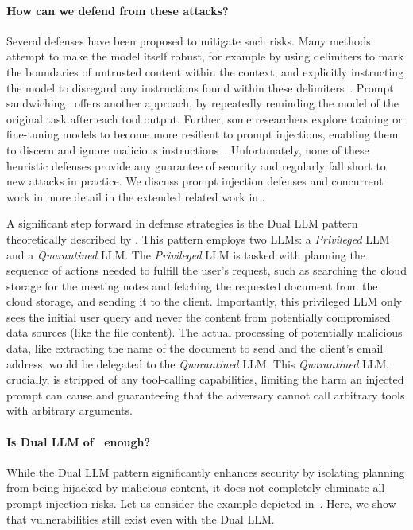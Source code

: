 \documentclass[11pt, a4paper, logo, copyright]{googledeepmind}
\begin{document}
\paragraph{How can we defend from these attacks?} Several defenses have been proposed to mitigate such risks. Many methods attempt to make the model itself robust, for example by using delimiters to mark the boundaries of untrusted content within the context, and explicitly instructing the model to disregard any instructions found within these delimiters~\citep{hines2024defending}. Prompt sandwiching~\citep{learnprompting2024sandwich} offers another approach, by repeatedly reminding the model of the original task after each tool output. Further, some researchers explore training or fine-tuning models to become more resilient to prompt injections, enabling them to discern and ignore malicious instructions~\citep{chen2024struq, wallace2024instruction,wu2024instructional}. Unfortunately, none of these heuristic defenses provide any guarantee of security and regularly fall short to new attacks in practice. We discuss prompt injection defenses and concurrent work in more detail in the extended related work in .

A significant step forward in defense strategies is the Dual LLM pattern theoretically described by \citet{willison2023dualllm}. This pattern employs two LLMs: a \textit{Privileged} LLM and a \textit{Quarantined} LLM. The \textit{Privileged} LLM is tasked with planning the sequence of actions needed to fulfill the user's request, such as searching the cloud storage for the meeting notes and fetching the requested document from the cloud storage, and sending it to the client. Importantly, this privileged LLM only sees the initial user query and never the content from potentially compromised data sources (like the file content). The actual processing of potentially malicious data, like extracting the name of the document to send and the client's email address, would be delegated to the \textit{Quarantined} LLM. This \textit{Quarantined} LLM, crucially, is stripped of any tool-calling capabilities, limiting the harm an injected prompt can cause and guaranteeing that the adversary cannot call arbitrary tools with arbitrary arguments.

\paragraph{Is Dual LLM of~\citeauthor{willison2023dualllm} enough?}\xspace While the Dual LLM pattern significantly enhances security by isolating planning from being hijacked by malicious content, it does not completely eliminate all prompt injection risks. Let us consider the example depicted in~. Here, we show that vulnerabilities still exist even with the Dual LLM.
\end{document}
